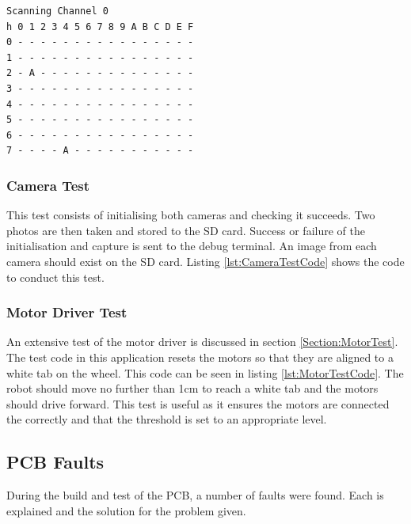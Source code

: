 \begin{lstlisting}[caption={Result of \itc bus scan with Channel 0 of the \itc multiplexer selected},label={lst:I2CTest}]
Scanning Channel 0
h 0 1 2 3 4 5 6 7 8 9 A B C D E F
0 - - - - - - - - - - - - - - - -
1 - - - - - - - - - - - - - - - -
2 - A - - - - - - - - - - - - - -
3 - - - - - - - - - - - - - - - -
4 - - - - - - - - - - - - - - - -
5 - - - - - - - - - - - - - - - -
6 - - - - - - - - - - - - - - - -
7 - - - - A - - - - - - - - - - -
\end{lstlisting}

\subsubsection{Camera Test}\label{Camera:Test}

This test consists of initialising both cameras and checking it succeeds. Two photos are then taken and stored to the SD card. Success or failure of the initialisation and capture is sent to the debug terminal. An image from each camera should exist on the SD card. Listing \ref{lst:CameraTestCode} shows the code to conduct this test.


\subsubsection{Motor Driver Test}\label{Motor:Test}
An extensive test of the motor driver is discussed in section \ref{Section:MotorTest}. The test code in this application resets the motors so that they are aligned to a white tab on the wheel. This code can be seen in listing \ref{lst:MotorTestCode}. The robot should move no further than 1cm to reach a white tab and the motors should drive forward. This test is useful as it ensures the motors are connected the correctly and that the threshold is set to an appropriate level.



\subsection{PCB Faults}
During the build and test of the PCB, a number of faults were found. Each is explained and the solution for the problem given. 
